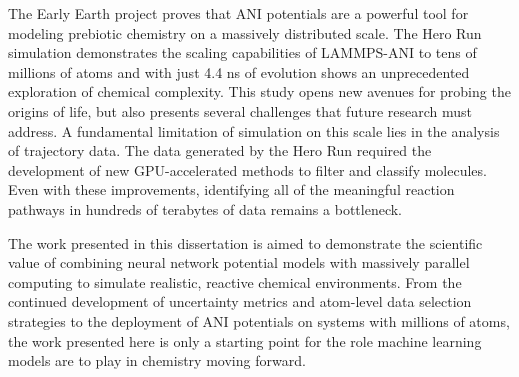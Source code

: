 The Early Earth project proves that ANI potentials are a powerful tool for modeling prebiotic chemistry on a massively distributed scale. 
The Hero Run simulation demonstrates the scaling capabilities of LAMMPS-ANI to tens of millions of atoms and with just 4.4 ns of evolution shows an unprecedented exploration of chemical complexity.
This study opens new avenues for probing the origins of life, but also presents several challenges that future research must address.
A fundamental limitation of simulation on this scale lies in the analysis of trajectory data. 
The data generated by the Hero Run required the development of new GPU-accelerated methods to filter and classify molecules. 
Even with these improvements, identifying all of the meaningful reaction pathways in hundreds of terabytes of data remains a bottleneck. 

The work presented in this dissertation is aimed to demonstrate the scientific value of combining neural network potential models with massively parallel computing to simulate realistic, reactive chemical environments.
From the continued development of uncertainty metrics and atom-level data selection strategies to the deployment of ANI potentials on systems with millions of atoms, the work presented here is only a starting point for the role machine learning models are to play in chemistry moving forward.
